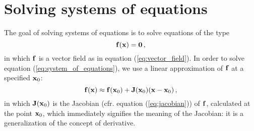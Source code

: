 \section{Solving systems of equations}
    The goal of solving systems of equations is to solve equations of the type
    \begin{equation} \label{eq:system_of_equations}
        \vb{f}(\vb{x}) = \vb{0} \thinspace ,
    \end{equation}
    in which $\vb{f}$ is a vector field as in equation (\ref{eq:vector_field}). In order to solve equation (\ref{eq:system_of_equations}), we use a linear approximation of $\vb{f}$ at a specified $\vb{x}_0$:
    \begin{equation} \label{eq:system_of_equations_jacobian}
        \vb{f}(\vb{x}) \approx \vb{f}(\vb{x}_0) + \vb{J}(\vb{x}_0) (\vb{x} - \vb{x}_0) \thinspace ,
    \end{equation}
    in which $\vb{J}(\vb{x}_0)$ is the Jacobian (cfr. equation (\ref{eq:jacobian})) of $\vb{f}$, calculated at the point $\vb{x}_0$, which immediately signifies the meaning of the Jacobian: it is a generalization of the concept of derivative.

